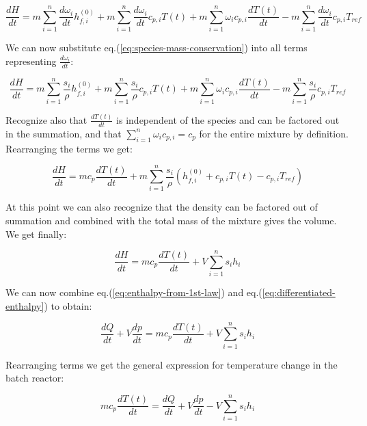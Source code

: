 \documentclass[10pt]{article}
\begin{document}
\begin{equation*}
\frac{dH}{dt} = m \sum_{i=1}^n  \frac{d \omega_i}{dt}  h_{f,i}^{(0)}  + m \sum_{i=1}^n \frac{d \omega_i}{dt} c_{p,i} T(t) + m \sum_{i=1}^n \omega_i c_{p,i} \frac{d T(t)}{dt}  - m \sum_{i=1}^n \frac{d \omega_i}{dt} c_{p,i} T_{ref}
\end{equation*}

We can now substitute eq.(\ref{eq:species-mass-conservation}) into all terms  representing $\frac{d \omega_i}{dt}$:

\begin{equation*}
\frac{dH}{dt} = m \sum_{i=1}^n  \frac{s_i}{\rho}  h_{f,i}^{(0)}  + m \sum_{i=1}^n \frac{s_i}{\rho} c_{p,i} T(t) + m \sum_{i=1}^n \omega_i c_{p,i} \frac{d T(t)}{dt}  - m \sum_{i=1}^n \frac{s_i}{\rho} c_{p,i} T_{ref}
\end{equation*}

Recognize also that $\frac{d T(t)}{dt}$ is independent of the species and can be factored out in the summation, and that $\sum_{i=1}^n \omega_i c_{p,i} = c_p$ for the entire mixture by definition. Rearranging the terms we get:

\begin{equation*}
\frac{dH}{dt} = m c_{p} \frac{d T(t)}{dt} + m \sum_{i=1}^n  \frac{s_i}{\rho}  ( h_{f,i}^{(0)} + c_{p,i} T(t)  - c_{p,i} T_{ref})
\end{equation*}

At this point we can also recognize that the density can be factored out of summation and combined with the total mass of the mixture gives the volume. We get finally:

\begin{equation} \label{eq:differentiated-enthalpy}
\frac{dH}{dt} = m c_{p} \frac{d T(t)}{dt} + V \sum_{i=1}^n  s_i  h_i
\end{equation}

We can now combine eq.(\ref{eq:enthalpy-from-1st-law}) and eq.(\ref{eq:differentiated-enthalpy}) to obtain:

\begin{equation} 
\frac{dQ}{dt} + V \frac{dp}{dt} = m c_{p} \frac{d T(t)}{dt} + V \sum_{i=1}^n  s_i h_i
\end{equation}

Rearranging terms we get the general expression for temperature change in the batch reactor:

\begin{equation} \label{eq:bath-reactor-energy}
m c_{p} \frac{d T(t)}{dt}  = \frac{dQ}{dt} + V \frac{dp}{dt} - V \sum_{i=1}^n  s_i  h_i 
\end{equation}
\end{document}
